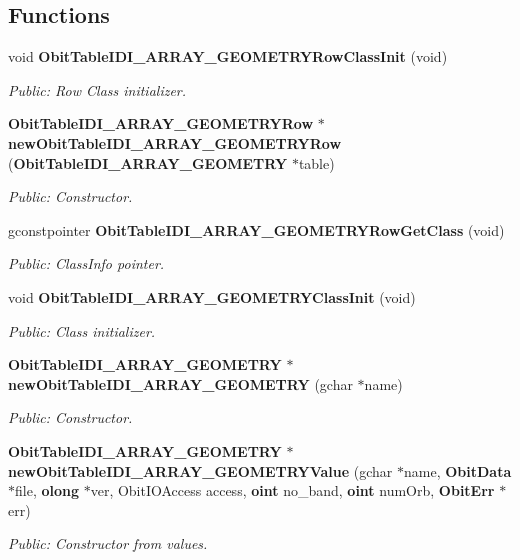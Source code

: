 \subsection*{Functions}
\begin{CompactItemize}
\item 
void {\bf Obit\-Table\-IDI\_\-ARRAY\_\-GEOMETRYRow\-Class\-Init} (void)
\begin{CompactList}\small\item\em Public: Row Class initializer. \item\end{CompactList}\item 
{\bf Obit\-Table\-IDI\_\-ARRAY\_\-GEOMETRYRow} $\ast$ {\bf new\-Obit\-Table\-IDI\_\-ARRAY\_\-GEOMETRYRow} ({\bf Obit\-Table\-IDI\_\-ARRAY\_\-GEOMETRY} $\ast$table)
\begin{CompactList}\small\item\em Public: Constructor. \item\end{CompactList}\item 
gconstpointer {\bf Obit\-Table\-IDI\_\-ARRAY\_\-GEOMETRYRow\-Get\-Class} (void)
\begin{CompactList}\small\item\em Public: Class\-Info pointer. \item\end{CompactList}\item 
void {\bf Obit\-Table\-IDI\_\-ARRAY\_\-GEOMETRYClass\-Init} (void)
\begin{CompactList}\small\item\em Public: Class initializer. \item\end{CompactList}\item 
{\bf Obit\-Table\-IDI\_\-ARRAY\_\-GEOMETRY} $\ast$ {\bf new\-Obit\-Table\-IDI\_\-ARRAY\_\-GEOMETRY} (gchar $\ast$name)
\begin{CompactList}\small\item\em Public: Constructor. \item\end{CompactList}\item 
{\bf Obit\-Table\-IDI\_\-ARRAY\_\-GEOMETRY} $\ast$ {\bf new\-Obit\-Table\-IDI\_\-ARRAY\_\-GEOMETRYValue} (gchar $\ast$name, {\bf Obit\-Data} $\ast$file, {\bf olong} $\ast$ver, Obit\-IOAccess access, {\bf oint} no\_\-band, {\bf oint} num\-Orb, {\bf Obit\-Err} $\ast$err)
\begin{CompactList}\small\item\em Public: Constructor from values. \item\end{CompactList}\item 

\end{CompactItemize}
